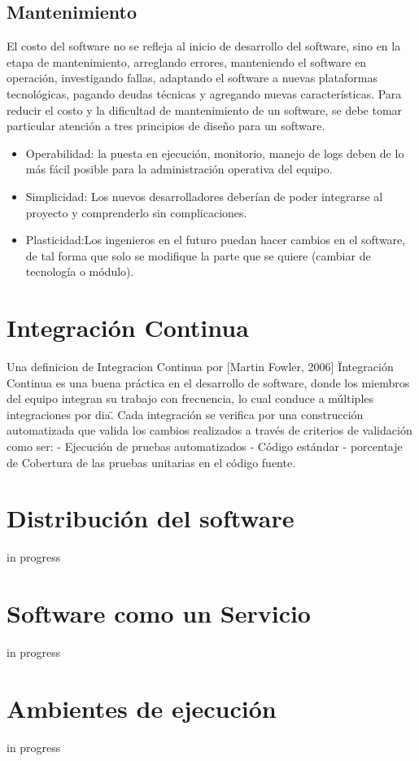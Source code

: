 \subsection{Mantenimiento}
\noindent El costo del software no se refleja al inicio de desarrollo del software, sino en la etapa de mantenimiento, arreglando errores, manteniendo el software en operación, investigando fallas, adaptando el software a nuevas plataformas tecnológicas, pagando deudas técnicas y agregando nuevas características.
Para reducir el costo y la dificultad de mantenimiento de un software, se debe tomar particular atención a tres principios de diseño para un software.
\begin{itemize}
\item Operabilidad: la puesta en ejecución, monitorio, manejo de logs deben de lo más fácil posible para la administración operativa del equipo.
\item Simplicidad: Los nuevos desarrolladores deberían de poder integrarse al proyecto y comprenderlo sin complicaciones.
\item Plasticidad:Los ingenieros en el futuro puedan hacer cambios en el software, de tal forma que solo se modifique la parte que se quiere (cambiar de tecnología o módulo).
\end{itemize}

\section{Integración Continua}
\noindent Una definicion de Integracion Continua por [Martin Fowler, 2006] \"Integración Continua es una buena práctica en el desarrollo de software, donde los miembros del equipo integran su trabajo con frecuencia, lo cual conduce a múltiples integraciones por dia\". Cada integración se verifica por una construcción automatizada que valida los cambios realizados a través de criterios de validación como ser:
- Ejecución de pruebas automatizados
- Código estándar
- porcentaje de Cobertura de las pruebas unitarias en el código fuente.

\section{Distribución del software}
\noindent in progress

\section{Software como un Servicio}
\noindent in progress

\section{Ambientes de ejecución}
\noindent in progress
